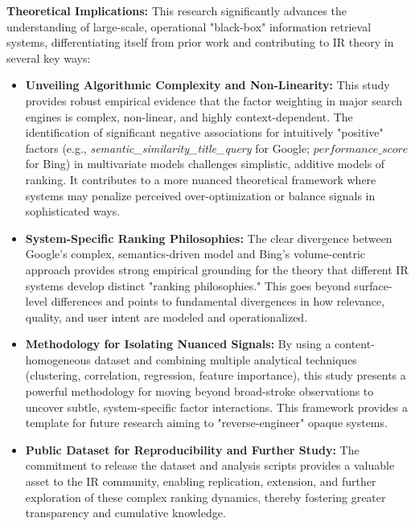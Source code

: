 \documentclass[a4paper,fleqn]{cas-sc}
\newcommand{\longvar}[1]{\textit{#1}}
\begin{document}
\textbf{Theoretical Implications:} This research significantly advances the understanding of large-scale, operational "black-box" information retrieval systems, differentiating itself from prior work and contributing to IR theory in several key ways:
\begin{itemize}
    \item \textbf{Unveiling Algorithmic Complexity and Non-Linearity:} This study provides robust empirical evidence that the factor weighting in major search engines is complex, non-linear, and highly context-dependent. The identification of significant negative associations for intuitively "positive" factors (e.g., \longvar{semantic_similarity_title_query} for Google; $performance\_score$ for Bing) in multivariate models challenges simplistic, additive models of ranking. It contributes to a more nuanced theoretical framework where systems may penalize perceived over-optimization or balance signals in sophisticated ways.
    \item \textbf{System-Specific Ranking Philosophies:} The clear divergence between Google's complex, semantics-driven model and Bing's volume-centric approach provides strong empirical grounding for the theory that different IR systems develop distinct "ranking philosophies." This goes beyond surface-level differences and points to fundamental divergences in how relevance, quality, and user intent are modeled and operationalized.
    \item \textbf{Methodology for Isolating Nuanced Signals:} By using a content-homogeneous dataset and combining multiple analytical techniques (clustering, correlation, regression, feature importance), this study presents a powerful methodology for moving beyond broad-stroke observations to uncover subtle, system-specific factor interactions. This framework provides a template for future research aiming to "reverse-engineer" opaque systems.
    \item \textbf{Public Dataset for Reproducibility and Further Study:} The commitment to release the dataset and analysis scripts provides a valuable asset to the IR community, enabling replication, extension, and further exploration of these complex ranking dynamics, thereby fostering greater transparency and cumulative knowledge.
\end{itemize}
\end{document}
